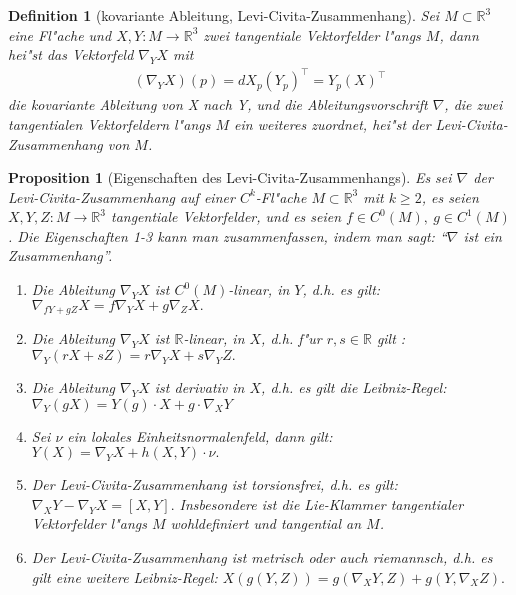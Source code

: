 \documentclass[10pt,a4paper]{article}
\newcommand{\fc}[1]{\special{fc=#1}}
\newtheorem{defi}[sat]{Definition}
\newtheorem{prop}[sat]{Proposition}
\begin{document}
\fc{DLeviCivita}
\begin{defi}[kovariante Ableitung, Levi-Civita-Zusammenhang]
 Sei $M\subset \mathbb{R}^3$ eine Fl"ache und $X,Y:M\rightarrow \mathbb{R}^3$ zwei tangentiale Vektorfelder l"angs $M$,
 dann hei"st das Vektorfeld $\nabla_Y X$ mit
 \begin{align*}
  (\nabla_Y X)(p) = dX_p(Y_p)^\top = Y_p(X)^\top
 \end{align*}
die kovariante Ableitung von X nach Y, und die Ableitungsvorschrift $\nabla$, die zwei tangentialen Vektorfeldern l"angs $M$
ein weiteres zuordnet, hei"st der Levi-Civita-Zusammenhang von $M$.
\end{defi}

\fc{PEigLeviC}
\begin{prop}[Eigenschaften des Levi-Civita-Zusammenhangs]
 Es sei $\nabla$ der Levi-Civita-Zusammenhang auf einer $C^k$-Fl"ache $M\subset \mathbb{R}^3$ mit $k\geq 2$, es seien $X,Y,Z:M\rightarrow\mathbb{R}^3$
 tangentiale Vektorfelder, und es seien $f\in C^0(M),\ g\in C^1(M)$. Die Eigenschaften 1-3 kann man zusammenfassen, indem man sagt: ``$\nabla$ ist ein Zusammenhang''.
 \begin{enumerate}
  \item  Die Ableitung $\nabla_Y X$ ist $C^0(M)$-linear, in $Y$, d.h. es gilt:\qquad
  $ \nabla_{fY+gZ} X = f\nabla_Y X + g\nabla_Z X.$

  \item  Die Ableitung $\nabla_Y X$ ist $\mathbb{R}$-linear, in $X$, d.h. f"ur $r,s\in \mathbb{R}$ gilt :\qquad
$   \nabla_Y (rX +sZ) = r\nabla_Y X + s\nabla_Y Z.$

  \item Die Ableitung $\nabla_Y X$ ist derivativ in $X$, d.h. es gilt die Leibniz-Regel:\qquad
   $\nabla_Y (gX) = Y(g)\cdot X + g\cdot \nabla_X Y$


 \item Sei $\nu$ ein lokales Einheitsnormalenfeld, dann gilt:\qquad
  $Y(X) = \nabla_Y X + h(X,Y)\cdot \nu.$

 \item Der Levi-Civita-Zusammenhang ist torsionsfrei, d.h. es gilt:\qquad
  $\nabla_X Y - \nabla_Y X = \left[X,Y\right].$
Insbesondere ist die Lie-Klammer tangentialer Vektorfelder l"angs $M$ wohldefiniert und tangential an $M$.
 
 \item Der Levi-Civita-Zusammenhang ist metrisch oder auch riemannsch, d.h. es gilt eine weitere Leibniz-Regel:\qquad
  $X(g(Y,Z)) = g(\nabla_X Y,Z) + g(Y, \nabla_X Z).$
 \end{enumerate}



\end{prop}
\end{document}
